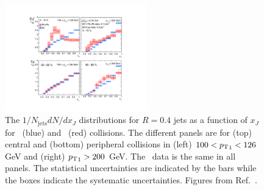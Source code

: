 \begin{figure}[htbp]
\begin{center}
\includegraphics[width=0.55\textwidth]{figures/jetMeasurements/xJ}
\caption{The $1/N_\mathrm{jets} dN/dx_J$ distributions for $R=0.4$ jets as a function of $x_J$ for \pp\ (blue) and \pbpb\ (red) collisions.
The different panels are for (top) central and (bottom) peripheral collisions in (left) $100 < \mbox{$p_{\mathrm{T}}$}_1 < 126$ GeV and (right) $\mbox{$p_{\mathrm{T}}$}_1 > 200 $ GeV.
The \pp\ data is the same in all panels.
The statistical uncertainties are indicated by the bars while the boxes indicate the systematic uncertainties.
Figures from Ref.~\cite{Aaboud:2017eww}.}
\label{fig:xJ}
\end{center}
\end{figure}








%
